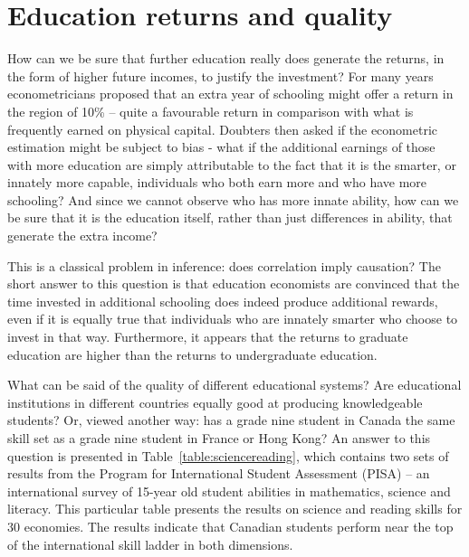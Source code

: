 \section{Education returns and quality}\label{sec:ch13sec5}

How can we be sure that further education really does generate the returns, in the form of higher future incomes, to justify the investment? For many years econometricians proposed that an extra year of schooling might offer a return in the region of 10\% -- quite a favourable return in comparison with what is frequently earned on physical capital. Doubters then asked if the econometric estimation might be subject to bias - what if the additional earnings of those with more education are simply attributable to the fact that it is the smarter, or innately more capable, individuals who both earn more and who have more schooling? And since we cannot observe who has more innate ability, how can we be sure that it is the education itself, rather than just differences in ability, that generate the extra income?  

This is a classical problem in inference: does correlation imply causation? The short answer to this question is that education economists are convinced that the time invested in additional schooling does indeed produce additional rewards, even if it is equally true that individuals who are innately smarter who choose to invest in that way. Furthermore, it appears that the returns to graduate education are higher than the returns to undergraduate education.

What can be said of the quality of different educational systems? Are educational institutions in different countries equally good at producing knowledgeable students? Or, viewed another way: has a grade nine student in Canada the same skill set as a grade nine student in France or Hong Kong? An answer to this question is presented in Table~\ref{table:sciencereading}, which contains two sets of results from the Program for International Student Assessment (PISA) -- an international survey of 15-year old student abilities in mathematics, science and literacy. This particular table presents the results on science and reading skills for 30 economies. The results indicate that Canadian students perform near the top of the international skill ladder in both dimensions.

